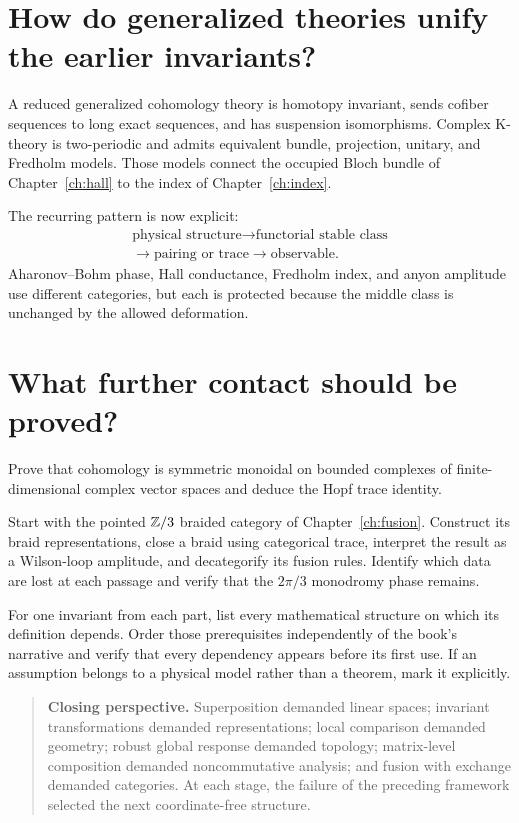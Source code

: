 \section{How do generalized theories unify the earlier invariants?}

A reduced generalized cohomology theory is homotopy invariant, sends cofiber
sequences to long exact sequences, and has suspension isomorphisms.  Complex
K-theory is two-periodic and admits equivalent bundle, projection, unitary,
and Fredholm models.  Those models connect the occupied Bloch bundle of
Chapter~\ref{ch:hall} to the index of Chapter~\ref{ch:index}.

The recurring pattern is now explicit:
\[
\begin{gathered}
\text{physical structure}\longrightarrow\text{functorial stable class}
\\[-2pt]
\longrightarrow\text{pairing or trace}\longrightarrow\text{observable}.
\end{gathered}
\]
Aharonov--Bohm phase, Hall conductance, Fredholm index, and anyon amplitude
use different categories, but each is protected because the middle class is
unchanged by the allowed deformation.

\section{What further contact should be proved?}

\begin{exercise}
Prove that cohomology is symmetric monoidal on bounded complexes of
finite-dimensional complex vector spaces and deduce the Hopf trace identity.
\end{exercise}

\begin{exercise}
Start with the pointed $\mathbb Z/3$ braided category of
Chapter~\ref{ch:fusion}.  Construct its braid representations, close a braid
using categorical trace, interpret the result as a Wilson-loop amplitude, and
decategorify its fusion rules.  Identify which data are lost at each passage
and verify that the $2\pi/3$ monodromy phase remains.
\end{exercise}

\begin{exercise}
For one invariant from each part, list every mathematical structure on which
its definition depends.  Order those prerequisites independently of the
book's narrative and verify that every dependency appears before its first
use.  If an assumption belongs to a physical model rather than a theorem,
mark it explicitly.
\end{exercise}

\begin{quote}\textbf{Closing perspective.} Superposition demanded linear
spaces; invariant transformations demanded representations; local comparison
demanded geometry; robust global response demanded topology; matrix-level
composition demanded noncommutative analysis; and fusion with exchange
demanded categories.  At each stage, the failure of the preceding framework
selected the next coordinate-free structure.\end{quote}
